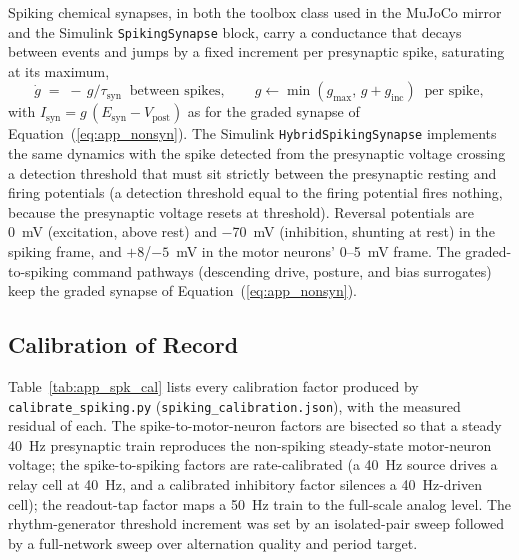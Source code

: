Spiking chemical synapses, in both the toolbox class used in the MuJoCo mirror and the Simulink \texttt{SpikingSynapse} block, carry a conductance that decays between events and jumps by a fixed increment per presynaptic spike, saturating at its maximum,
\begin{equation}
    \dot{g} \;=\; -\,g/\tau_{\text{syn}} \;\;\text{between spikes}, 
    \qquad g \leftarrow \min\!\left(g_{\max},\, g + g_{\text{inc}}\right) \;\;\text{per spike},
    \label{eq:app_spk_syn}
\end{equation}
with $I_{\text{syn}} = g\,(E_{\text{syn}} - V_{\text{post}})$ as for the graded synapse of Equation~(\ref{eq:app_nonsyn}). The Simulink \texttt{HybridSpikingSynapse} implements the same dynamics with the spike detected from the presynaptic voltage crossing a detection threshold that must sit strictly between the presynaptic resting and firing potentials (a detection threshold equal to the firing potential fires nothing, because the presynaptic voltage resets at threshold). Reversal potentials are \qty{0}{\mV} (excitation, above rest) and \qty{-70}{\mV} (inhibition, shunting at rest) in the spiking frame, and $+8$/$-5$~mV in the motor neurons' 0--5~mV frame. The graded-to-spiking command pathways (descending drive, posture, and bias surrogates) keep the graded synapse of Equation~(\ref{eq:app_nonsyn}).

\subsection{Calibration of Record}

Table~\ref{tab:app_spk_cal} lists every calibration factor produced by \texttt{calibrate\_spiking.py} (\texttt{spiking\_calibration.json}), with the measured residual of each. The spike-to-motor-neuron factors are bisected so that a steady \qty{40}{\hertz} presynaptic train reproduces the non-spiking steady-state motor-neuron voltage; the spike-to-spiking factors are rate-calibrated (a \qty{40}{\hertz} source drives a relay cell at \qty{40}{\hertz}, and a calibrated inhibitory factor silences a \qty{40}{\hertz}-driven cell); the readout-tap factor maps a \qty{50}{\hertz} train to the full-scale analog level. The rhythm-generator threshold increment was set by an isolated-pair sweep followed by a full-network sweep over alternation quality and period target.

